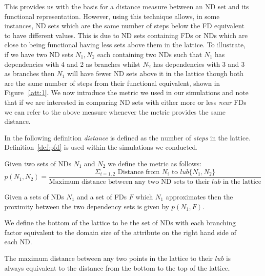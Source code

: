 \smallskip

This provides us with the basis for a distance measure between an ND set
and its functional representation. However,  using this technique allows,
in some instances, ND sets which are the same number of steps below the
FD equivalent to have different values. This is due to ND sets containing
FDs or NDs which are close to being functional having less sets above them
in the lattice. To illustrate, if we have two ND sets $N_1,N_2$ each containing two NDs such that $N_1$ has dependencies with 4 and 2 as branches whilst $N_2$ has dependencies with 3 and 3 as branches then $N_1$ will have fewer ND sets
above it in the lattice though both are the same number of steps from their
functional equivalent, shown in Figure~\ref{latt:1}. We now introduce the 
metric we used in our simulations
and note that if we are interested in comparing ND sets with either more 
or less {\em near} FDs we can refer to the above measure 
whenever the metric provides the same distance.
\smallskip

In the following definition {\em distance} is defined as the number of
{\em steps} in the lattice. Definition~\ref{def:pfd} is used within
the simulations we conducted.

\begin{definition}
\begin{rm}
Given two sets of NDs $N_1$ and $N_2$ we define the metric as follows: 
\[
p(N_1,N_2) = \frac{\Sigma_{i = 1, 2} \mbox{ Distance from } N_i \mbox{ to }  lub \{ N_1, N_2 \}}
{\mbox{Maximum distance between any two ND sets to their $lub$ in the lattice}}
\]
\end{rm}
\end{definition}

\begin{definition}\label{def:pfd}
\begin{rm}
Given a sets of NDs $N_1$ and a set of FDs $F$ which $N_1$ approximates
then the proximity between the two dependency sets is given by $p(N_1,F)$.
\end{rm}
\end{definition}

We define the bottom of the
lattice to be the set of NDs with each branching factor equivalent to
the domain size of the attribute on the right hand side of each
ND.

\smallskip
\begin{proposition}
\begin{rm}
The maximum distance between any two points in
the lattice to their $lub$ is always equivalent to the
distance from the bottom to the top of the lattice. 
\end{rm}
\end{proposition}

